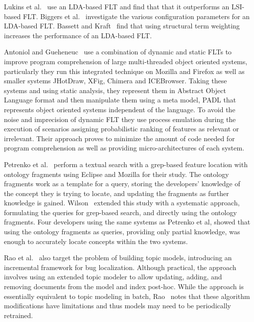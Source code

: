 Lukins et al.~\cite{Lukins-etal:2008} use an LDA-based FLT and find that that it
outperforms an LSI-based FLT.  Biggers et al.~\cite{Biggers-etal:2014}
investigate the various configuration parameters for an LDA-based FLT.  Bassett
and Kraft~\cite{Bassett-Kraft:2013} find that using structural term weighting
increases the performance of an LDA-based FLT.

Antoniol and Gueheneuc~\cite{Antoniol-Gueheneuc:2005, Antoniol-Gueheneuc:2006}
use a combination of dynamic and static FLTs to improve program comprehension of
large multi-threaded object oriented systems, particularly they run this
integrated technique on Mozilla and Firefox as well as smaller systems JHotDraw,
XFig, Chimera and ICEBrowser. Taking these systems and using static analysis,
they represent them in Abstract Object Language format and then manipulate them
using a meta model, PADL that represents object oriented systems independent of
the language. To avoid the noise and imprecision of dynamic FLT they use process
emulation during the execution of scenarios assigning probabilistic ranking of
features as relevant or irrelevant. Their approach proves to minimize the amount
of code needed for program comprehension as well as providing
micro-architectures of each system.

Petrenko et al.~\cite{Petrenko-etal:2008} perform a textual search with
a grep-based feature location with ontology fragments using Eclipse and Mozilla
for their study. The ontology fragments work as a template for a query, storing
the developers' knowledge of the concept they is trying to locate, and updating
the fragments as further knowledge is gained. Wilson~\cite{Wilson:2010} extended
this study with a systematic approach, formulating the queries for grep-based
search, and directly using the ontology fragments. Four developers using the
same systems as Petrenko et al, showed that using the ontology fragments as
queries, providing only partial knowledge, was enough to accurately locate
concepts within the two systems.

Rao et al.~\cite{Rao-etal:2013} also target the problem of building topic
models, introducing an incremental framework for bug localization.  Although
practical, the approach involves using an extended topic modeler to allow
updating, adding, and removing documents from the model and index post-hoc.
While the approach is essentially equivalent to topic modeling in batch,
Rao~\cite{Rao:2013} notes that these algorithm modifications have limitations
and thus models may need to be periodically retrained.

